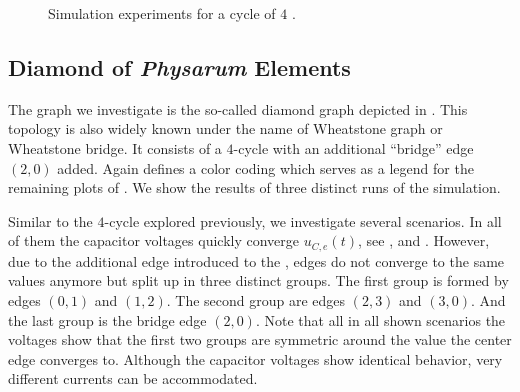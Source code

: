 		\begin{figure}
			\centering
			\qquad
			\newline
			\qquad
			\newline
			\qquad
			\newline
			\qquad
			
			\caption[Cycle simulations]{Simulation experiments for a cycle of $4$ \Pes.}
			\label{fig:cycle}
		\end{figure}

	\subsection{Diamond of \emph{Physarum} Elements}

		The graph we investigate is the so-called diamond graph depicted in . This topology is also widely known under the name of Wheatstone graph or Wheatstone bridge. It consists of a $4$-cycle with an additional ``bridge'' edge $(2,0)$ added. Again  defines a color coding which serves as a legend for the remaining plots of . We show the results of three distinct runs of the simulation.

		Similar to the $4$-cycle explored previously, we investigate several scenarios. In all of them the capacitor voltages quickly converge $u_{C,e}(t)$, see ,  and . However, due to the additional edge introduced to the \Pn, edges do not converge to the same values anymore but split up in three distinct groups. The first group is formed by edges $(0,1)$ and $(1,2)$. The second group are edges $(2,3)$ and $(3,0)$. And the last group is the bridge edge $(2,0)$. Note that all in all shown scenarios the voltages show that the first two groups are symmetric around the value the center edge converges to. Although the capacitor voltages show identical behavior, very different currents can be accommodated.

